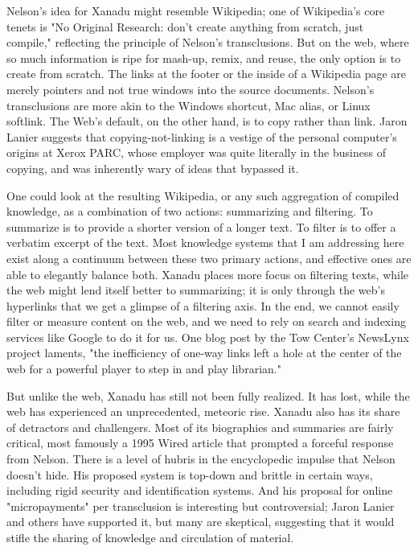 Nelson's idea for Xanadu might resemble Wikipedia; one of Wikipedia's core tenets is "No Original Research: don't create anything from scratch, just compile," reflecting the principle of Nelson's transclusions.  But on the web, where so much information is ripe for mash-up, remix, and reuse, the only option is to create from scratch. The links at the footer or the inside of a Wikipedia page are merely pointers and not true windows into the source documents. Nelson's transclusions are more akin to the Windows shortcut, Mac alias, or Linux softlink. The Web's default, on the other hand, is to copy rather than link. Jaron Lanier suggests that copying-not-linking is a vestige of the personal computer's origins at Xerox PARC, whose employer was quite literally in the business of copying, and was inherently wary of ideas that bypassed it. 

One could look at the resulting Wikipedia, or any such aggregation of compiled knowledge, as a combination of two actions: summarizing and filtering. To summarize is to provide a shorter version of a longer text. To filter is to offer a verbatim excerpt of the text. Most knowledge systems that I am addressing here exist along a continuum between these two primary actions, and effective ones are able to elegantly balance both. Xanadu places more focus on filtering texts, while the web might lend itself better to summarizing; it is only through the web's hyperlinks that we get a glimpse of a filtering axis. In the end, we cannot easily filter or measure content on the web, and we need to rely on search and indexing services like Google to do it for us. One blog post by the Tow Center's NewsLynx project laments, "the inefficiency of one-way links left a hole at the center of the web for a powerful player to step in and play librarian." 

But unlike the web, Xanadu has still not been fully realized. It has lost, while the web has experienced an unprecedented, meteoric rise. Xanadu also has its share of detractors and challengers. Most of its biographies and summaries are fairly critical, most famously a 1995 Wired article that prompted a forceful response from Nelson.  There is a level of hubris in the encyclopedic impulse that Nelson doesn't hide. His proposed system is top-down and brittle in certain ways, including rigid security and identification systems. And his proposal for online "micropayments" per transclusion is interesting but controversial; Jaron Lanier and others have supported it, but many are skeptical, suggesting that it would stifle the sharing of knowledge and circulation of material. 

